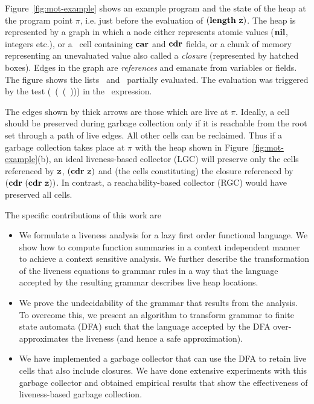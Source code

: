 \documentclass[9pt]{sigplanconf}
\newcommand{\mycomment}[1]{}
\begin{document}
Figure~\ref{fig:mot-example} shows an example program and the state of
the heap at  the program point $\pi$, i.e. just  before the evaluation
of $(\mathbf{length}\  \mbox{\tt z})$.  The heap is  represented by a graph  in which a
node either  represents atomic  values ($\mbox{$\mathbf{ nil}$}$,  integers etc.),  or a
\CONS\ cell containing $\mbox{$\mathbf{car}$}$ and $\mbox{$\mathbf{cdr}$}$  fields, or a chunk of memory
representing  an  unevaluated  value   also  called  a  {\em  closure}
(represented  by  hatched  boxes).   Edges   in  the  graph  are  {\em
  references} and emanate from variables  or fields.  The figure shows
the  lists \px\  and  \pz\ partially  evaluated.   The evaluation  was
triggered    by   the    test   (\NULLQ~(\CAR~(\CDR~\pz)))    in   the
\SIF\ expression.


The edges  shown by thick  arrows are those  which are live  at $\pi$.
Ideally, a cell should be  preserved during garbage collection only if
it is reachable from  the root set through a path  of live edges.  All
other  cells can  be reclaimed.   Thus if  a garbage  collection takes
place at $\pi$ with the heap shown in Figure~\ref{fig:mot-example}(b),
an ideal liveness-based  collector (LGC) will preserve  only the cells
referenced by  $\mbox{\tt z}$, $(\mbox{$\mathbf{cdr}$}~ \mbox{\tt z})$  and (the cells  constituting) the
closure   referenced   by   $(\mbox{$\mathbf{cdr}$}~(\mbox{$\mathbf{cdr}$}~\mbox{\tt z}))$.    In   contrast,   a
reachability-based collector (RGC) would have preserved all cells.

The specific contributions of this work are
  \begin{itemize}
  \item  We formulate  a  liveness  analysis for  a  lazy first  order
    functional language. We show how  to compute function summaries in
    a  context  independent  manner  to achieve  a  context  sensitive
    analysis. We  further describe the transformation  of the liveness
    equations to grammar rules in a  way that the language accepted by
    the resulting grammar describes live heap locations.\mycomment{the
      proof of its correctness}
  \item We prove  the undecidability of the grammar  that results from
    the  analysis.   To overcome  this,  we  present an  algorithm  to
    transform grammar  to finite  state automata  (DFA) such  that the
    language accepted by the  DFA over-approximates the liveness (and
    hence a safe approximation).
  \item We have implemented a garbage  collector that can use the DFA
    to  retain live  cells that  also include  closures. We  have done
    extensive  experiments with  this garbage  collector and  obtained
    empirical results  that show  the effectiveness  of liveness-based
    garbage collection.
  \end{itemize}
\end{document}

